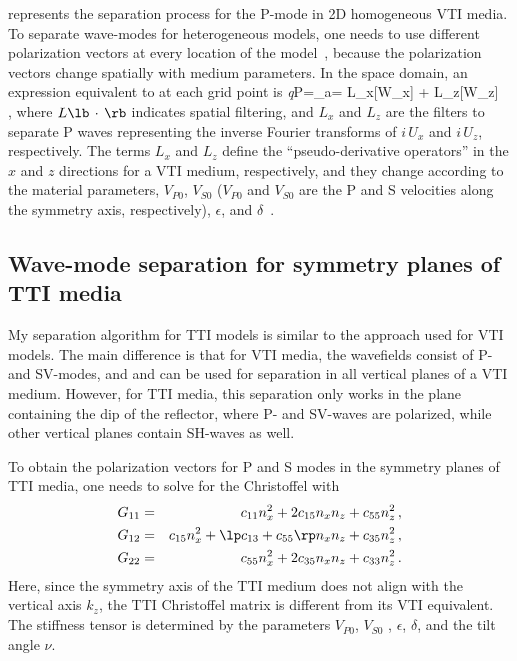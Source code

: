  represents the separation process for the 
P-mode in 2D homogeneous VTI media. To separate wave-modes for
heterogeneous models, one needs to use different polarization vectors at every
location of the model~\cite[]{yan:WB19}, because the polarization
vectors change spatially with medium parameters.  In the space domain,
an expression equivalent to  at each grid point is
\beq\label{AniDivX}
{\it q}P=\nabla_a\cdot \WW     = L_x[W_x] + L_z[W_z] \, ,
\eeq
where $L\lb\,\cdot\,\rb$ indicates spatial filtering, and $L_x$ and $L_z$
are the filters to separate P waves representing the inverse Fourier
transforms of $i\, U_x$ and $i\, U_z$, respectively. The terms $L_x$
and $L_z$ define the ``pseudo-derivative operators'' in the $x$ and $z$
directions for a VTI medium, respectively, and they change according to the material
parameters, $V_{P0}$, $V_{S0}$ ($V_{P0}$ and $V_{S0}$ are the P and S
velocities along the symmetry axis, respectively), $\epsilon$, and
$\delta$~\cite[]{thomsen:1954}.

\subsection{Wave-mode separation for symmetry planes of TTI media}
My separation algorithm for TTI models is similar to the approach
used for VTI models.  The main difference is that for VTI media, the
wavefields consist of P- and SV-modes, and 
and  can be used for separation in all vertical planes of
a VTI medium. However, for TTI media, this separation only works in
the plane containing the dip of the reflector, where P- and SV-waves are
polarized, while other vertical planes contain SH-waves as well.


To obtain the polarization vectors for P and S modes in the symmetry
planes of TTI media, one needs to solve for the Christoffel 
with 
\begin{eqnarray}
G_{11}&=&c_{11} n_x^2 +2c_{15}n_xn_z+c_{55} n_z^2 \, ,\\
G_{12}&=&c_{15} n_x^2+\lp c_{13}+c_{55}\rp n_xn_z+c_{35} n_z^2\, ,\\
G_{22}&=&c_{55} n_x^2 +2c_{35}n_xn_z+c_{33} n_z^2\, .
\end{eqnarray}
Here, since the symmetry axis of the TTI medium does not align with
the vertical axis $k_z$, the TTI Christoffel matrix is different from
its VTI equivalent. The stiffness tensor is determined by the
parameters $V_{P0}$, $V_{S0}$ , $\epsilon$, $\delta$, and the tilt angle
$\nu$.

